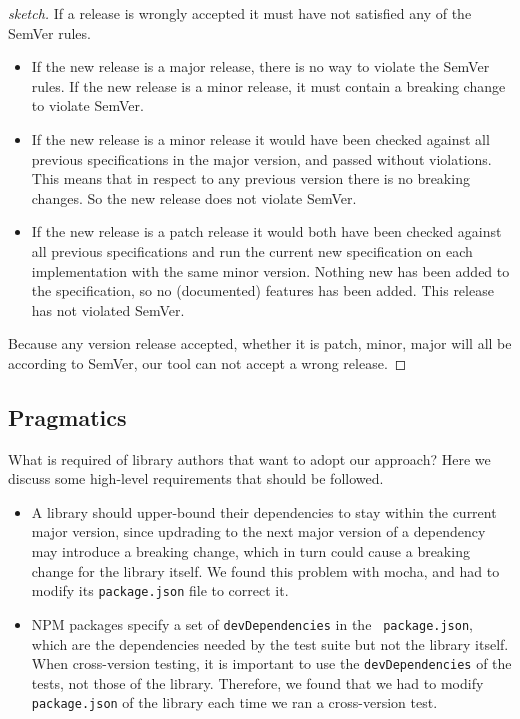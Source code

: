\begin{proof}[sketch]
If a release is wrongly accepted it must have not satisfied any of the SemVer
rules. 

\begin{itemize}
    \item If the new release is a major release, there is no way to violate the
    SemVer rules. If the new release is a minor release, it must contain a breaking
    change to violate SemVer. 
    \item If the new release is a minor release it would have been checked against all
    previous specifications in the major version, and passed without violations.
    This means that in respect to any previous version there is no breaking
    changes. So the new release does not violate SemVer.\
    \item If the new release is a patch release it would both have been checked against all 
    previous specifications and run the current new specification on each
    implementation with the same minor version. Nothing new has been added to the
    specification, so no (documented) features has been added. This release has not
    violated SemVer.
\end{itemize}

Because any version release accepted, whether it is patch, minor, major will all be according to 
SemVer, our tool can not accept a wrong release.
\end{proof}

\subsection{Pragmatics}
What is required of library authors that want to adopt our approach?
Here we discuss some high-level requirements that should be followed.

\begin{itemize}
\item A library should upper-bound their dependencies to stay within
  the current major version, since updrading to the next major version
  of a dependency may introduce a breaking change, which in turn could
  cause a breaking change for the library itself. We found this
  problem with mocha, and had to modify its {\tt package.json} file to
  correct it.
\item NPM packages specify a set of {\tt devDependencies} in the {\tt
    package.json}, which are the dependencies needed by the test suite
  but not the library itself. When cross-version testing, it is
  important to use the {\tt devDependencies} of the tests, not those
  of the library. Therefore, we found that we had to modify {\tt
    package.json} of the library each time we ran a cross-version
  test.
\end{itemize}

